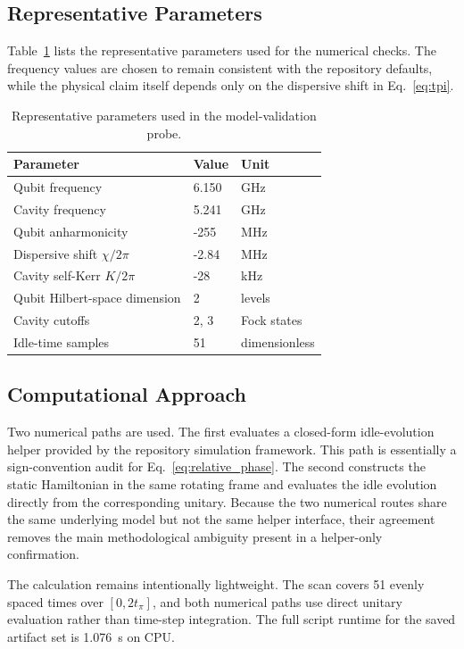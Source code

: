 \documentclass[aps,pra,twocolumn,reprint,amsmath,amssymb]{revtex4-2}
\begin{document}
\subsection{Representative Parameters}
Table~\ref{tab:parameters} lists the representative parameters used for the numerical checks. The frequency values are chosen to remain consistent with the repository defaults, while the physical claim itself depends only on the dispersive shift in Eq.~\eqref{eq:tpi}.

\begin{table}[t]
\caption{Representative parameters used in the model-validation probe.}
\label{tab:parameters}
\begin{tabular}{lll}
\toprule
Parameter & Value & Unit \\
\midrule
Qubit frequency & 6.150 & GHz \\
Cavity frequency & 5.241 & GHz \\
Qubit anharmonicity & -255 & MHz \\
Dispersive shift $\chi/2\pi$ & -2.84 & MHz \\
Cavity self-Kerr $K/2\pi$ & -28 & kHz \\
Qubit Hilbert-space dimension & 2 & levels \\
Cavity cutoffs & 2, 3 & Fock states \\
Idle-time samples & 51 & dimensionless \\
\bottomrule
\end{tabular}
\end{table}

\subsection{Computational Approach}
Two numerical paths are used. The first evaluates a closed-form idle-evolution helper provided by the repository simulation framework. This path is essentially a sign-convention audit for Eq.~\eqref{eq:relative_phase}. The second constructs the static Hamiltonian in the same rotating frame and evaluates the idle evolution directly from the corresponding unitary. Because the two numerical routes share the same underlying model but not the same helper interface, their agreement removes the main methodological ambiguity present in a helper-only confirmation.

The calculation remains intentionally lightweight. The scan covers 51 evenly spaced times over $[0, 2 t_{\pi}]$, and both numerical paths use direct unitary evaluation rather than time-step integration. The full script runtime for the saved artifact set is \SI{1.076}{\second} on CPU.
\end{document}
